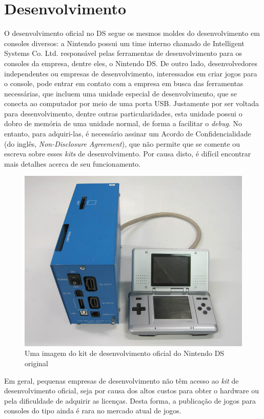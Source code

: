 \documentclass[brazil]{abnt}
\begin{document}
\section{Desenvolvimento}

O desenvolvimento oficial no DS segue os mesmos moldes do desenvolvimento em consoles diversos: a Nintendo possui um time interno chamado de Intelligent Systems Co. Ltd. responsável pelas ferramentas de desenvolvimento para os consoles da empresa, dentre eles, o Nintendo DS. De outro lado, desenvolvedores independentes ou empresas de desenvolvimento, interessados em criar jogos para o console, pode entrar em contato com a empresa em busca das ferramentas necessárias, que incluem uma unidade especial de desenvolvimento, que se conecta ao computador por meio de uma porta USB. Justamente por ser voltada para desenvolvimento, dentre outras particularidades, esta unidade possui o dobro de memória de uma unidade normal, de forma a facilitar o \textit{debug}. No entanto, para adquiri-las, é necessário assinar um Acordo de Confidencialidade (do inglês, \textit{Non-Disclosure Agreement}), que não permite que se comente ou escreva sobre esses \textit{kits} de desenvolvimento. Por causa disto, é difícil encontrar mais detalhes acerca de seu funcionamento.

\begin{figure}
\centering
\includegraphics{imgs/is_devkit1.jpg}
\caption{Uma imagem do kit de desenvolvimento oficial do Nintendo DS original} 
\end{figure}

Em geral, pequenas empresas de desenvolvimento não têm acesso ao \textit{kit} de desenvolvimento oficial, seja por causa dos altos custos para obter o hardware ou pela dificuldade de adquirir as licenças. Desta forma, a publicação de jogos para consoles do tipo ainda é rara no mercado atual de jogos.
\end{document}
